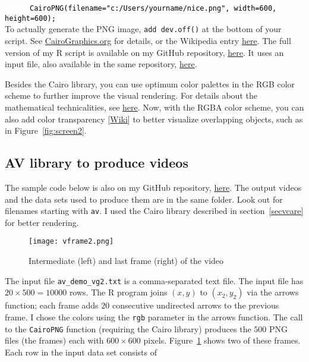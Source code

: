 \documentclass[oneside,10pt]{book}
\begin{document}
\noindent \textcolor{white}{000000}\texttt{\textcolor{black}{CairoPNG(filename="c:/Users/yourname/nice.png", width=600, height=600);}} \\

\noindent To actually generate the PNG image, \texttt{add dev.off()} at the bottom of your script. See \href{https://www.cairographics.org/}{CairoGraphics.org} for details, or the Wikipedia entry \href{https://en.wikipedia.org/wiki/Cairo_(graphics)}{here}.
The full version of my R script is available on my GitHub repository, \href{https://github.com/VincentGranville/Point-Processes/blob/main/Source\%20Code/PP_NN_arrows.r}{here}. It uses an input file, also available in the same repository, \href{https://github.com/VincentGranville/Point-Processes/blob/main/Data/PB_r.txt}{here}.



Besides the Cairo library, you can use optimum \textcolor{index}{color palettes} in the
 \textcolor{index}{RGB color scheme} to further improve the visual rendering. For details about the mathematical technicalities,
 see \href{https://mathoverflow.net/questions/415618/lattice-like-structure-with-maximum-spacing-between-vertices}{here}.
Now, with the \textcolor{index}{RGBA color scheme}, you can also add \textcolor{index}{color transparency} [\href{https://en.wikipedia.org/wiki/Alpha_compositing}{Wiki}] to better visualize
 overlapping objects, such as in Figure~\ref{fig:screen2}.

\subsection{AV library to produce videos}

The sample code below is also on my GitHub repository, \href{https://github.com/VincentGranville/Point-Processes/tree/main/Videos}{here}. The output videos and the data sets used to produce  them are in the same folder. Look out for filenames
 starting with \texttt{av}.  I used the Cairo library described in section~\ref{secvcare} for better rendering.


\begin{figure}%
\centering
\texttt{[image: vframe2.png]} %
\caption{Intermediate (left) and last frame (right) of the video}
\label{fig:vfr2}
\end{figure}

The input file \texttt{av\_demo\_vg2.txt} is a comma-separated text file. The input file has $20 \times 500 = \num{10000}$ rows. The R program joins $(x, y)$ to $(x_2, y_2)$ via the arrows function; each frame adds $20$ consecutive undirected arrows to the previous frame. I chose the colors using the \texttt{rgb} parameter in the arrows function. The call to the
\texttt{CairoPNG} function (requiring the Cairo library) produces the $500$ PNG files (the frames) each with
$600 \times 600$ pixels. Figure~\ref{fig:vfr2} shows two of these frames. Each row in the input data set consists of
\end{document}
